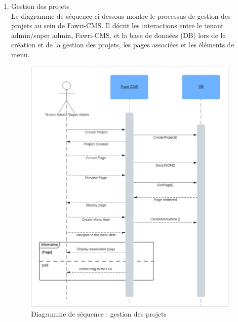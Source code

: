 \begin{enumerate}
  \item Gestion des projets\\
        Le diagramme de séquence ci-dessous montre le processus de gestion des projets au sein de Fawri-CMS. Il décrit les interactions entre le tenant admin/super admin, Fawri-CMS, et la base de données (DB) lors de la création et de la gestion des projets, les pages associées et les éléments de menu.
        \begin{figure}[H]
          \centering
          \includegraphics[width=11cm]{Figures/diagsec_Gestion_projets.png}
          \caption{Diagramme de séquence : gestion des projets}
        \end{figure}





\end{enumerate}
